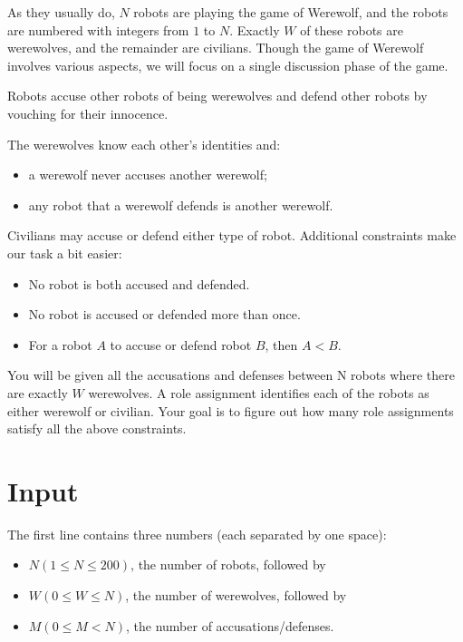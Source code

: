 As they usually do, $N$ robots are playing the game of Werewolf, and the robots are numbered with integers from $1$ to $N$. Exactly $W$ of these robots are werewolves, and the remainder are civilians. Though the game of Werewolf involves various aspects, we will focus on a single discussion phase of the game.

Robots accuse other robots of being werewolves and defend other robots by vouching for their innocence.

The werewolves know each other's identities and:

\begin{itemize}
\item a werewolf never accuses another werewolf;
\item any robot that a werewolf defends is another werewolf.
\end{itemize}

Civilians may accuse or defend either type of robot.
Additional constraints make our task a bit easier:

\begin{itemize}
\item No robot is both accused and defended.
\item No robot is accused or defended more than once.
\item For a robot $A$ to accuse or defend robot $B$, then $A < B$.
\end{itemize}

You will be given all the accusations and defenses between N robots where there are exactly $W$ werewolves. A role assignment identifies each of the robots as either werewolf or civilian. Your goal is to figure out how many role assignments satisfy all the above constraints.

\section*{Input}
The first line contains three numbers (each separated by one space):

\begin{itemize}
\item $N (1 \leq N \leq 200)$, the number of robots, followed by
\item $W (0 \leq W \leq N)$, the number of werewolves, followed by
\item $M (0 \leq M < N)$, the number of accusations/defenses.
\end{itemize}

